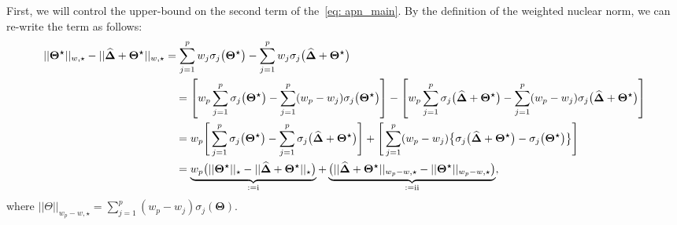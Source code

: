 \documentclass[alpha-refs]{wiley-article}
\newcommand{\RN}[1]{ \textup{\uppercase\expandafter{\romannumeral#1}} }
\begin{document}
First, we will control the upper-bound on the second term of the~\eqref{eq: apn_main}.
By the definition of the weighted nuclear norm, we can re-write the term as follows:
\begin{align}
    ||\boldsymbol{\Theta^{\star}}||_{w,\star} - ||\boldsymbol{\widehat{\Delta}} + \boldsymbol{\Theta^{\star}}||_{w,\star} 
    &= \sum^{p}_{j = 1} w_{j}\sigma_{j}\big(\boldsymbol{\Theta^{\star}}\big) - \sum^{p}_{j = 1} w_{j}\sigma_{j}\big(\boldsymbol{\widehat{\Delta}} + \boldsymbol{\Theta^{\star}}\big)  \nonumber \\
    & \quad = \left[w_{p}\sum^{p}_{j = 1}\sigma_{j}\big(\boldsymbol{\Theta^{\star}}\big) - \sum^{p}_{j = 1}(w_{p} - w_{j})\sigma_{j}\big(\boldsymbol{\Theta^{\star}}\big)\right] - \left[w_{p}\sum^{p}_{j = 1}\sigma_{j}\big(\boldsymbol{\widehat{\Delta}} + \boldsymbol{\Theta^{\star}}\big) - \sum^{p}_{j = 1}(w_{p} - w_{j})\sigma_{j}\big(\boldsymbol{\widehat{\Delta}} + \boldsymbol{\Theta^{\star}}\big)\right] \nonumber \\
    & \quad = w_{p}\Bigg[ \sum^{p}_{j = 1}\sigma_{j}\big(\boldsymbol{\Theta^{\star}}\big) - \sum^{p}_{j = 1}\sigma_{j}\big(\boldsymbol{\widehat{\Delta}} + \boldsymbol{\Theta^{\star}}\big) \Bigg] + \Bigg[ \sum^{p}_{j=1}(w_{p} - w_{j})\big\{ \sigma_{j}\big(\boldsymbol{\widehat{\Delta}} + \boldsymbol{\Theta^{\star}}\big)-\sigma_{j}\big(\boldsymbol{\Theta^{\star}}\big)\big\}\Bigg] \nonumber\\
    & \quad = \underbrace{w_{p}\big( ||\boldsymbol{\Theta^{\star}}||_{\star} - ||\boldsymbol{\widehat{\Delta}} + \boldsymbol{\Theta^{\star}}||_{\star} \big)}_{:=\RN{1}} + \underbrace{\big( ||\boldsymbol{\widehat{\Delta}} + \boldsymbol{\Theta^{\star}}||_{w_{p}-w,\star} - ||\boldsymbol{\Theta^{\star}}||_{w_{p}-w,\star}\big)}_{:=\RN{2}}, \label{eq: wnn_diff}
\end{align}
where $||\Theta||_{w_{p} - w, \star} = \sum^{p}_{j = 1} (w_{p} - w_{j})\sigma_{j}(\boldsymbol{\Theta})$.
\end{document}
